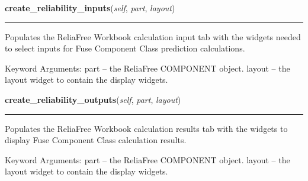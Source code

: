     \label{reliafree:miscellaneous:fuse:Fuse:create_reliability_inputs}

    \vspace{0.5ex}

\hspace{.8\funcindent}\begin{boxedminipage}{\funcwidth}

    \raggedright \textbf{create\_reliability\_inputs}(\textit{self}, \textit{part}, \textit{layout})

    \vspace{-1.5ex}

    \rule{\textwidth}{0.5\fboxrule}
\setlength{\parskip}{2ex}
    Populates the ReliaFree Workbook calculation input tab with the widgets
    needed to select inputs for Fuse Component Class prediction 
    calculations.

    Keyword Arguments: part   -- the ReliaFree COMPONENT object. layout -- 
    the layout widget to contain the display widgets.

\setlength{\parskip}{1ex}
    \end{boxedminipage}

    \label{reliafree:miscellaneous:fuse:Fuse:create_reliability_outputs}

    \vspace{0.5ex}

\hspace{.8\funcindent}\begin{boxedminipage}{\funcwidth}

    \raggedright \textbf{create\_reliability\_outputs}(\textit{self}, \textit{part}, \textit{layout})

    \vspace{-1.5ex}

    \rule{\textwidth}{0.5\fboxrule}
\setlength{\parskip}{2ex}
    Populates the ReliaFree Workbook calculation results tab with the 
    widgets to display Fuse Component Class calculation results.

    Keyword Arguments: part   -- the ReliaFree COMPONENT object. layout -- 
    the layout widget to contain the display widgets.

\setlength{\parskip}{1ex}
    \end{boxedminipage}

